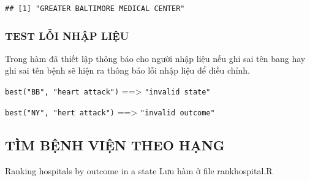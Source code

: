 \documentclass[
]{book}
\theoremstyle{definition}
\theoremstyle{definition}
\theoremstyle{definition}
\theoremstyle{definition}
\theoremstyle{remark}
\begin{document}
\begin{verbatim}
## [1] "GREATER BALTIMORE MEDICAL CENTER"
\end{verbatim}

\hypertarget{test-lux1ed7i-nhux1eadp-liux1ec7u}{%
\subsubsection{TEST LỖI NHẬP LIỆU}\label{test-lux1ed7i-nhux1eadp-liux1ec7u}}

Trong hàm đã thiết lập thông báo cho người nhập liệu nếu ghi sai tên bang hay ghi sai tên bệnh sẽ hiện ra thông báo lỗi nhập liệu để điều chỉnh.

\texttt{best("BB",\ "heart\ attack")} ==\textgreater{} \texttt{"invalid\ state"}

\texttt{best("NY",\ "hert\ attack")} ==\textgreater{} \texttt{"invalid\ outcome"}

\hypertarget{tuxecm-bux1ec7nh-viux1ec7n-theo-hux1ea1ng}{%
\subsection{TÌM BỆNH VIỆN THEO HẠNG}\label{tuxecm-bux1ec7nh-viux1ec7n-theo-hux1ea1ng}}

Ranking hospitals by outcome in a state
Lưu hàm ở file rankhospital.R
\end{document}
